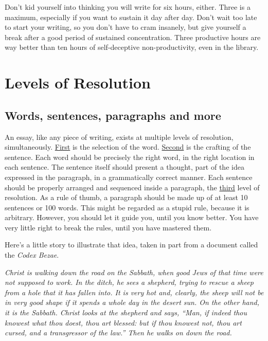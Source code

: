 \documentclass{article}
\begin{document}
Don't kid yourself into thinking you will write for six hours, either.
Three is a maximum, especially if you want to sustain it day after day.
Don't wait too late to start your writing, so you don't have to cram
insanely, but give yourself a break after a good period of sustained
concentration. Three productive hours are way better than ten hours of
self-deceptive non-productivity, even in the library.

\textbf{\hfill\break}

\section{Levels of Resolution}

\subsection{Words, sentences, paragraphs and more}

An essay, like any piece of writing, exists at multiple levels of
resolution, simultaneously. \ul{First} is the selection of the word­.
\ul{Second} is the crafting of the sentence. Each word should be
precisely the right word, in the right location in each sentence. The
sentence itself should present a thought, part of the idea expressed in
the paragraph, in a grammatically correct manner. Each sentence should
be properly arranged and sequenced inside a paragraph, the \ul{third}
level of resolution. As a rule of thumb, a paragraph should be made up
of at least 10 sentences or 100 words. This might be regarded as a
stupid rule, because it is arbitrary. However, you should let it guide
you, until you know better. You have very little right to break the
rules, until you have mastered them.

Here's a little story to illustrate that idea, taken in part from a
document called the \emph{Codex Bezae}.

\emph{Christ is walking down the road on the Sabbath, when good Jews of
that time were not supposed to work. In the ditch, he sees a shepherd,
trying to rescue a sheep from a hole that it has fallen into. It is very
hot and, clearly, the sheep will not be in very good shape if it spends
a whole day in the desert sun. On the other hand, it is the Sabbath.
Christ looks at the shepherd and says, ``Man, if indeed thou knowest
what thou doest, thou art blessed: but if thou knowest not, thou art
cursed, and a transgressor of the law.'' Then he walks on down the
road.}
\end{document}

